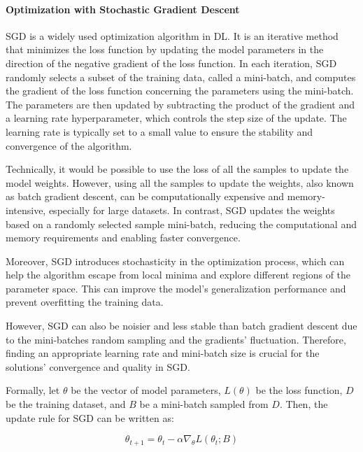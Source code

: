 \paragraph{Optimization with Stochastic Gradient Descent} \label{sec:sgd}

\Acf{SGD} is a widely used optimization algorithm in \ac{DL}. It is an iterative method that minimizes the loss function by updating the model parameters in the direction of the negative gradient of the loss function. In each iteration, \ac{SGD} randomly selects a subset of the training data, called a mini-batch, and computes the gradient of the loss function concerning the parameters using the mini-batch. The parameters are then updated by subtracting the product of the gradient and a learning rate hyperparameter, which controls the step size of the update. The learning rate is typically set to a small value to ensure the stability and convergence of the algorithm.

Technically, it would be possible to use the loss of all the samples to update the model weights. However, using all the samples to update the weights, also known as batch gradient descent, can be computationally expensive and memory-intensive, especially for large datasets. In contrast, \ac{SGD} updates the weights based on a randomly selected sample mini-batch, reducing the computational and memory requirements and enabling faster convergence.

Moreover, \ac{SGD} introduces stochasticity in the optimization process, which can help the algorithm escape from local minima and explore different regions of the parameter space. This can improve the model's generalization performance and prevent overfitting the training data.

However, \ac{SGD} can also be noisier and less stable than batch gradient descent due to the mini-batches random sampling and the gradients' fluctuation. Therefore, finding an appropriate learning rate and mini-batch size is crucial for the solutions' convergence and quality in \ac{SGD}.

Formally, let $\theta$ be the vector of model parameters, $L(\theta)$ be the loss function, $D$ be the training dataset, and $B$ be a mini-batch sampled from $D$. Then, the update rule for \ac{SGD} can be written as:

\begin{equation}
	\theta_{t+1} = \theta_{t} - \alpha \nabla_{\theta} L(\theta_t; B)
\end{equation}

